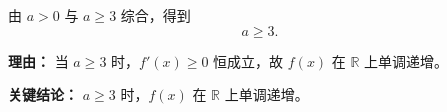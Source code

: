 \begin{examplebox}
\begin{description}[style=nextline, leftmargin=2.8em, labelsep=0.5em, itemsep=0.45em]
		\item[\textbf{第四步（综合结论）：}]
		      由 $a>0$ 与 $a\ge3$ 综合，得到
		      \[
			      \boxed{a\ge3.}
		      \]
		      \par\textbf{理由：} 当 $a\ge3$ 时，$f'(x)\ge0$ 恒成立，故 $f(x)$ 在 $\mathbb{R}$ 上单调递增。
	\end{description}

	\textbf{\textcolor{CExample}{关键结论：}}
	$a\ge3$ 时，$f(x)$ 在 $\mathbb{R}$ 上单调递增。
\end{examplebox}